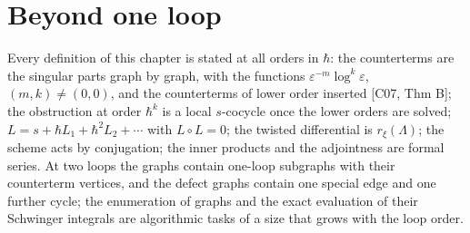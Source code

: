 \section{Beyond one loop}

\begin{remark}
Every definition of this chapter is stated at all orders in $\hbar$: the counterterms are the singular parts graph by graph, with the functions $\varepsilon^{-m}\log^k\varepsilon$, $(m,k)\neq(0,0)$, and the counterterms of lower order inserted [C07, Thm B]; the obstruction at order $\hbar^{k}$ is a local $s$-cocycle once the lower orders are solved; $L=s+\hbar L_1+\hbar^2L_2+\cdots$ with $L\circ L=0$; the twisted differential is $r_\xi(\Lambda)$; the scheme acts by conjugation; the inner products and the adjointness are formal series. At two loops the graphs contain one-loop subgraphs with their counterterm vertices, and the defect graphs contain one special edge and one further cycle; the enumeration of graphs and the exact evaluation of their Schwinger integrals are algorithmic tasks of a size that grows with the loop order.
\end{remark}

